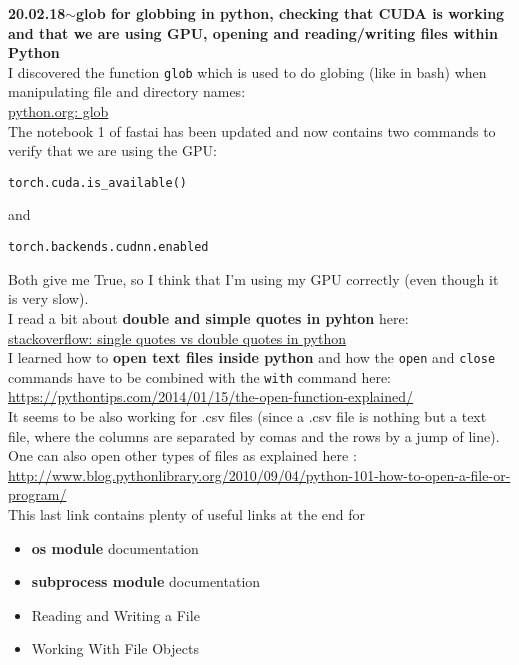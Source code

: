\documentclass[11pt,a4paper]{article}
\newenvironment{loggentry}[2]%
{\noindent\textbf{#1}\hspace{1cm}$\mathbf{\sim}$\text{ }\textbf{#2}\\}{\vspace{0.5cm}}
\begin{document}
\begin{loggentry}{20.02.18}{glob for globbing in python, checking that CUDA is working and that we are using GPU, opening and reading/writing files within Python}
I discovered the function \texttt{glob} which is used to do globing (like in bash) when manipulating file and directory names:\\
\href{https://docs.python.org/3/library/glob.html}{python.org: glob}\\
The notebook 1 of fastai has been updated and now contains two commands to verify that we are using the GPU:
\begin{verbatim}
torch.cuda.is_available()
\end{verbatim}
and
\begin{verbatim}
torch.backends.cudnn.enabled
\end{verbatim}
Both give me True, so I think that I'm using my GPU correctly (even though it is very slow).\\
I read a bit about \textbf{double and simple quotes in pyhton} here:\\
\href{https://stackoverflow.com/questions/56011/single-quotes-vs-double-quotes-in-python}{stackoverflow: single quotes vs double quotes in python}\\
I learned how to \textbf{open text files inside python} and how the \texttt{open} and \texttt{close} commands have to be combined with the \texttt{with} command here:\\
\url{https://pythontips.com/2014/01/15/the-open-function-explained/}\\
It seems to be also working for .csv files (since a .csv file is nothing but a text file, where the columns are separated by comas and the rows by a jump of line). One can also open other types of files as explained here :\\
\url{http://www.blog.pythonlibrary.org/2010/09/04/python-101-how-to-open-a-file-or-program/}\\
This last link contains plenty of useful links at the end for 
\begin{itemize}
\item \textbf{os module} documentation
\item \textbf{subprocess module} documentation
\item Reading and Writing a File
\item Working With File Objects
\end{itemize}
\end{loggentry}
\end{document}
